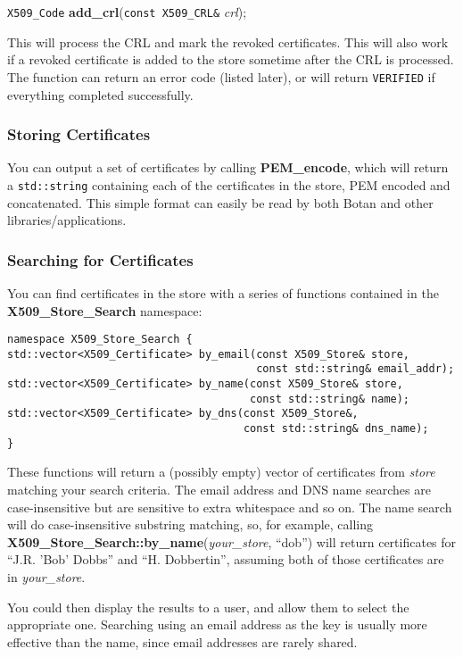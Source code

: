 \documentclass{article}
\newcommand{\function}[1]{\textbf{#1}}
\newcommand{\type}[1]{\texttt{#1}}
\renewcommand{\arg}[1]{\textsl{#1}}
\begin{document}
\type{X509\_Code} \function{add\_crl}(\type{const X509\_CRL\&} \arg{crl});

This will process the CRL and mark the revoked certificates. This will also
work if a revoked certificate is added to the store sometime after the CRL is
processed. The function can return an error code (listed later), or will return
\type{VERIFIED} if everything completed successfully.

\subsubsection{Storing Certificates}

You can output a set of certificates by calling \function{PEM\_encode}, which
will return a \type{std::string} containing each of the certificates in the
store, PEM encoded and concatenated. This simple format can easily be read by
both Botan and other libraries/applications.

\subsubsection{Searching for Certificates}

You can find certificates in the store with a series of functions contained
in the \function{X509\_Store\_Search} namespace:

\begin{verbatim}
namespace X509_Store_Search {
std::vector<X509_Certificate> by_email(const X509_Store& store,
                                       const std::string& email_addr);
std::vector<X509_Certificate> by_name(const X509_Store& store,
                                      const std::string& name);
std::vector<X509_Certificate> by_dns(const X509_Store&,
                                     const std::string& dns_name);
}
\end{verbatim}

These functions will return a (possibly empty) vector of certificates from
\arg{store} matching your search criteria. The email address and DNS name
searches are case-insensitive but are sensitive to extra whitespace and so
on. The name search will do case-insensitive substring matching, so, for
example, calling \function{X509\_Store\_Search::by\_name}(\arg{your\_store},
``dob'') will return certificates for ``J.R. 'Bob' Dobbs'' and
``H. Dobbertin'', assuming both of those certificates are in \arg{your\_store}.

You could then display the results to a user, and allow them to select the
appropriate one. Searching using an email address as the key is usually more
effective than the name, since email addresses are rarely shared.
\end{document}

